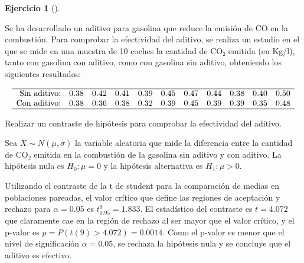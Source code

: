 \documentclass[
  a4paper,
]{scrreport}
\theoremstyle{definition}
\newtheorem{exercise}{Ejercicio}[chapter]
\theoremstyle{remark}
\begin{document}
\begin{tcolorbox}[enhanced jigsaw, leftrule=.75mm, colbacktitle=quarto-callout-tip-color!10!white, opacityback=0, colback=white, toprule=.15mm, colframe=quarto-callout-tip-color-frame, coltitle=black, left=2mm, title=\textcolor{quarto-callout-tip-color}{\faLightbulb}\hspace{0.5em}{Solución}, breakable, bottomtitle=1mm, bottomrule=.15mm, opacitybacktitle=0.6, toptitle=1mm, arc=.35mm, titlerule=0mm, rightrule=.15mm]

\end{tcolorbox}

\begin{exercise}[]\protect\hypertarget{exr-contraste-media-emision-CO2}{}\label{exr-contraste-media-emision-CO2}

Se ha desarrollado un aditivo para gasolina que reduce la emisión de CO
en la combustión. Para comprobar la efectividad del aditivo, se realiza
un estudio en el que se mide en una muestra de 10 coches la cantidad de
CO₂ emitida (en Kg/l), tanto con gasolina con aditivo, como con gasolina
sin aditivo, obteniendo los siguientes resultados:

\[
\begin{array}{rcccccccccc}
\hline
\mbox{Sin aditivo:}  & 0.38 & 0.42 & 0.41 & 0.39 & 0.45 & 0.47 & 0.44 & 0.38 & 0.40 & 0.50  \\
\mbox{Con  aditivo:} & 0.38 & 0.36 & 0.38 & 0.32 & 0.39 & 0.45 & 0.39 & 0.39 & 0.35 & 0.48 \\
\hline
\end{array}
\]

Realizar un contraste de hipótesis para comprobar la efectividad del
aditivo.

\end{exercise}

\begin{tcolorbox}[enhanced jigsaw, leftrule=.75mm, colbacktitle=quarto-callout-tip-color!10!white, opacityback=0, colback=white, toprule=.15mm, colframe=quarto-callout-tip-color-frame, coltitle=black, left=2mm, title=\textcolor{quarto-callout-tip-color}{\faLightbulb}\hspace{0.5em}{Solución}, breakable, bottomtitle=1mm, bottomrule=.15mm, opacitybacktitle=0.6, toptitle=1mm, arc=.35mm, titlerule=0mm, rightrule=.15mm]

Sea \(X\sim N(\mu,\sigma)\) la variable aleatoria que mide la diferencia
entre la cantidad de CO₂ emitida en la combustión de la gasolina sin
aditivo y con aditivo. La hipótesis nula es \(H_0: \mu = 0\) y la
hipótesis alternativa es \(H_1: \mu>0\).

Utilizando el contraste de la t de student para la comparación de medias
en poblaciones pareadas, el valor crítico que define las regiones de
aceptación y rechazo para \(\alpha=0.05\) es \(t^9_{0.95}=1.833\). El
estadístico del contraste es \(t=4.072\) que claramente cae en la región
de rechazo al ser mayor que el valor crítico, y el p-valor es
\(p = P(t(9)>4.072) = 0.0014\). Como el p-valor es menor que el nivel de
significación \(\alpha = 0.05\), se rechaza la hipótesis nula y se
concluye que el aditivo es efectivo.

\end{tcolorbox}
\end{document}
